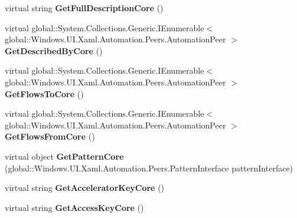 \begin{DoxyCompactItemize}
virtual string {\bfseries Get\+Full\+Description\+Core} ()
\item 
\mbox{\label{class_windows_1_1_u_i_1_1_xaml_1_1_automation_1_1_peers_1_1_automation_peer_af229ab1160fae56261351af4e4f4e4ab}} 
virtual global\+::\+System.\+Collections.\+Generic.\+I\+Enumerable$<$ global\+::\+Windows.\+U\+I.\+Xaml.\+Automation.\+Peers.\+Automation\+Peer $>$ {\bfseries Get\+Described\+By\+Core} ()
\item 
\mbox{\label{class_windows_1_1_u_i_1_1_xaml_1_1_automation_1_1_peers_1_1_automation_peer_a539ef8ed84355a4ed89c67cfc12b13cb}} 
virtual global\+::\+System.\+Collections.\+Generic.\+I\+Enumerable$<$ global\+::\+Windows.\+U\+I.\+Xaml.\+Automation.\+Peers.\+Automation\+Peer $>$ {\bfseries Get\+Flows\+To\+Core} ()
\item 
\mbox{\label{class_windows_1_1_u_i_1_1_xaml_1_1_automation_1_1_peers_1_1_automation_peer_af28cc07b8f441e466107608f74339c8f}} 
virtual global\+::\+System.\+Collections.\+Generic.\+I\+Enumerable$<$ global\+::\+Windows.\+U\+I.\+Xaml.\+Automation.\+Peers.\+Automation\+Peer $>$ {\bfseries Get\+Flows\+From\+Core} ()
\item 
\mbox{\label{class_windows_1_1_u_i_1_1_xaml_1_1_automation_1_1_peers_1_1_automation_peer_aa044472b4231fb26f5f1f9c526533020}} 
virtual object {\bfseries Get\+Pattern\+Core} (global\+::\+Windows.\+U\+I.\+Xaml.\+Automation.\+Peers.\+Pattern\+Interface pattern\+Interface)
\item 
\mbox{\label{class_windows_1_1_u_i_1_1_xaml_1_1_automation_1_1_peers_1_1_automation_peer_a9781a8d9c5fdebc0deb28ddc4586e09a}} 
virtual string {\bfseries Get\+Accelerator\+Key\+Core} ()
\item 
\mbox{\label{class_windows_1_1_u_i_1_1_xaml_1_1_automation_1_1_peers_1_1_automation_peer_a3d4baa373625c8c650d5f410d99b44ba}} 
virtual string {\bfseries Get\+Access\+Key\+Core} ()

\end{DoxyCompactItemize}
